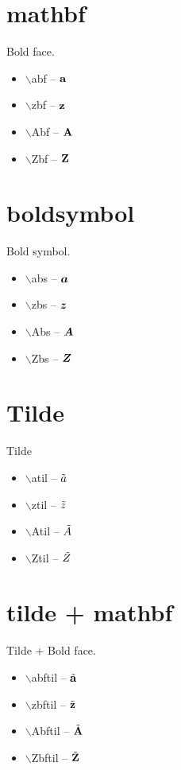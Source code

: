 \documentclass[twocolumn, a4paper]{article}
\begin{document}
	\section{mathbf}
	Bold face.
	\begin{itemize} 
		\item $\backslash$abf -- $\mathbf{a}$
		\item $\backslash$zbf -- $\mathbf{z}$  
		\item $\backslash$Abf -- $\mathbf{A}$
		\item $\backslash$Zbf -- $\mathbf{Z}$  
	\end{itemize}

	\section{boldsymbol}
	Bold symbol.
	\begin{itemize} 
		\item $\backslash$abs -- $\boldsymbol{a}$
		\item $\backslash$zbs -- $\boldsymbol{z}$  
		\item $\backslash$Abs -- $\boldsymbol{A}$
		\item $\backslash$Zbs -- $\boldsymbol{Z}$  
	\end{itemize}

	\section{Tilde}
	Tilde
	\begin{itemize} 
		\item $\backslash$atil -- $\tilde{a}$
		\item $\backslash$ztil -- $\tilde{z}$  
		\item $\backslash$Atil -- $\tilde{A}$
		\item $\backslash$Ztil -- $\tilde{Z}$  
	\end{itemize}
	
	\section{tilde + mathbf}
	Tilde + Bold face.
	\begin{itemize} 
		\item $\backslash$abftil -- $\tilde{\mathbf{a}}$
		\item $\backslash$zbftil -- $\tilde{\mathbf{z}}$  
		\item $\backslash$Abftil -- $\tilde{\mathbf{A}}$
		\item $\backslash$Zbftil -- $\tilde{\mathbf{Z}}$  
	\end{itemize}
\end{document}
